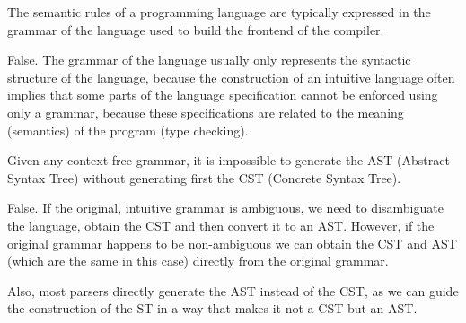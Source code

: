 \documentclass[docid=2020]{comp_test1}
\begin{document}
\vspace{-1em}
\begin{center}
\end{center}


\question
The semantic rules of a programming language are typically expressed in the grammar of the language used to build the frontend of the compiler.

\ansseparator

\noindent
False. The grammar of the language usually only represents the syntactic structure of the language, because the construction of an intuitive language often implies that some parts of the language specification cannot be enforced using only a grammar, because these specifications are related to the meaning (semantics) of the program (type checking).

\question
Given any context-free grammar, it is impossible to generate the AST (Abstract Syntax Tree) without generating first the CST (Concrete Syntax Tree). 

\ansseparator

\noindent
False. If the original, intuitive grammar is ambiguous, we need to disambiguate the language, obtain the CST and then convert it to an AST. However, if the original grammar happens to be non-ambiguous we can obtain the CST and AST (which are the same in this case) directly from the original grammar.

Also, most parsers directly generate the AST instead of the CST, as we can guide the construction of the ST in a way that makes it not a CST but an AST.
\end{document}
